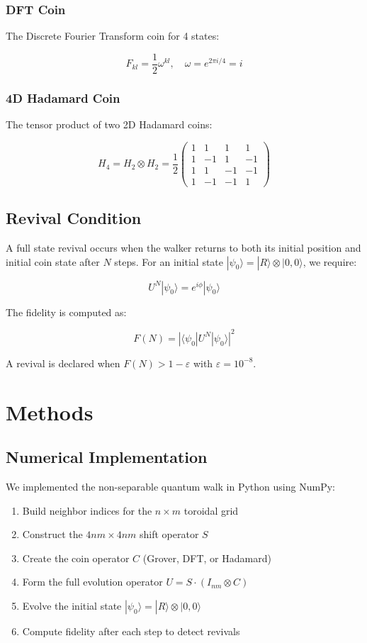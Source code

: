 \documentclass[12pt]{article}
\begin{document}
\subsubsection{DFT Coin}

The Discrete Fourier Transform coin for 4 states:

\[
F_{kl} = \frac{1}{2}\omega^{kl}, \quad \omega = e^{2\pi i/4} = i
\]

\subsubsection{4D Hadamard Coin}

The tensor product of two 2D Hadamard coins:

\[
H_4 = H_2 \otimes H_2 = \frac{1}{2}\begin{pmatrix}
1 & 1 & 1 & 1 \\
1 & -1 & 1 & -1 \\
1 & 1 & -1 & -1 \\
1 & -1 & -1 & 1
\end{pmatrix}
\]

\subsection{Revival Condition}

A full state revival occurs when the walker returns to both its initial position and initial coin state after $N$ steps. For an initial state $|\psi_0\rangle = |R\rangle \otimes |0,0\rangle$, we require:

\[
U^N |\psi_0\rangle = e^{i\phi} |\psi_0\rangle
\]

The fidelity is computed as:

\[
F(N) = |\langle \psi_0 | U^N | \psi_0 \rangle|^2
\]

A revival is declared when $F(N) > 1 - \varepsilon$ with $\varepsilon = 10^{-8}$.

\section{Methods}

\subsection{Numerical Implementation}

We implemented the non-separable quantum walk in Python using NumPy:

\begin{enumerate}
    \item Build neighbor indices for the $n \times m$ toroidal grid
    \item Construct the $4nm \times 4nm$ shift operator $S$
    \item Create the coin operator $C$ (Grover, DFT, or Hadamard)
    \item Form the full evolution operator $U = S \cdot (I_{nm} \otimes C)$
    \item Evolve the initial state $|\psi_0\rangle = |R\rangle \otimes |0,0\rangle$
    \item Compute fidelity after each step to detect revivals
\end{enumerate}
\end{document}
